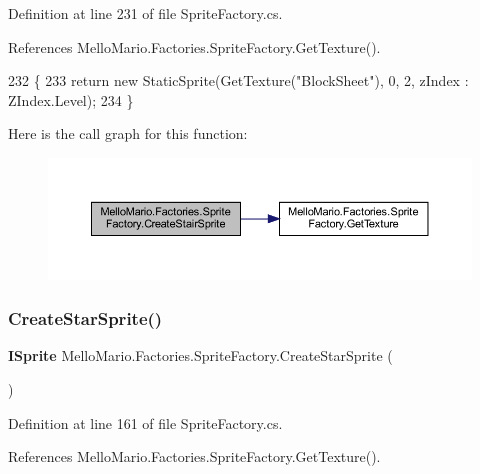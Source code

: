 Definition at line 231 of file Sprite\+Factory.\+cs.



References Mello\+Mario.\+Factories.\+Sprite\+Factory.\+Get\+Texture().


\begin{DoxyCode}
232         \{
233             \textcolor{keywordflow}{return} \textcolor{keyword}{new} StaticSprite(GetTexture(\textcolor{stringliteral}{"BlockSheet"}), 0, 2, zIndex : 
      ZIndex.Level);
234         \}
\end{DoxyCode}
Here is the call graph for this function\+:
\nopagebreak
\begin{figure}[H]
\begin{center}
\leavevmode
\includegraphics[width=350pt]{classMelloMario_1_1Factories_1_1SpriteFactory_a24b3d1609a17a13a3122f6dae1a67fcd_cgraph}
\end{center}
\end{figure}
\mbox{\label{classMelloMario_1_1Factories_1_1SpriteFactory_a697dac7e84cbd36a29ab5f10a935deef}} 
\subsubsection{Create\+Star\+Sprite()}
{\footnotesize\ttfamily \textbf{ I\+Sprite} Mello\+Mario.\+Factories.\+Sprite\+Factory.\+Create\+Star\+Sprite (\begin{DoxyParamCaption}{ }\end{DoxyParamCaption})}



Definition at line 161 of file Sprite\+Factory.\+cs.



References Mello\+Mario.\+Factories.\+Sprite\+Factory.\+Get\+Texture().


